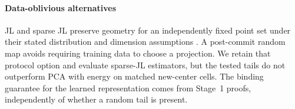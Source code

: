 \paragraph{Data-oblivious alternatives}
JL and sparse JL preserve geometry for an independently fixed point set under their stated distribution and dimension assumptions \cite{johnson1984extensions,achlioptas2003database,kane2014sparser,makarychev2019performance}. A post-commit random map avoids requiring training data to choose a projection. We retain that protocol option and evaluate sparse-JL estimators, but the tested tails do not outperform PCA with energy on matched new-center cells. The binding guarantee for the learned representation comes from Stage~1 proofs, independently of whether a random tail is present.
